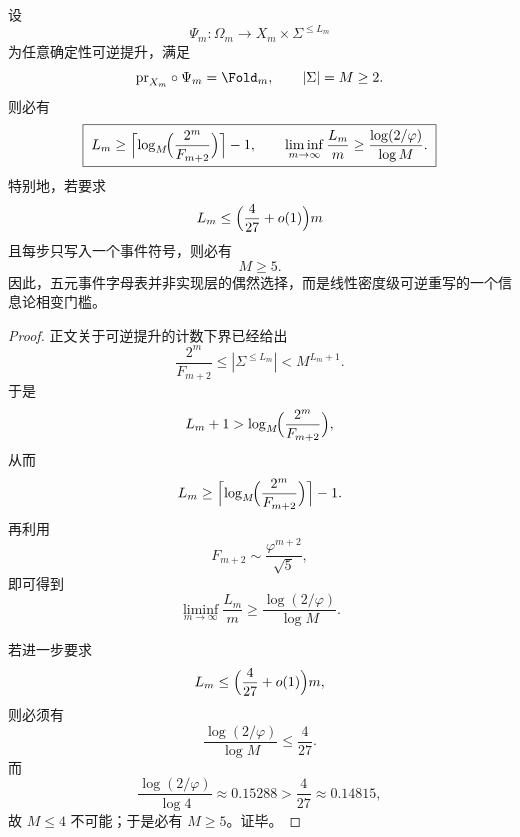 \begin{theorem}[五元事件字母表的不可降门槛]\label{thm:conclusion-godel-five-symbol-threshold}
设
\[
\Psi_m:\Omega_m\to X_m\times \Sigma^{\le L_m}
\]
为任意确定性可逆提升，满足
\[
\mathrm{pr}_{X_m}\circ\Psi_m=\Fold_m,
\qquad
|\Sigma|=M\ge 2.
\]
则必有
\[
\boxed{\;
L_m\ge \Bigl\lceil \log_M\!\Bigl(\frac{2^m}{F_{m+2}}\Bigr)\Bigr\rceil-1,\qquad
\liminf_{m\to\infty}\frac{L_m}{m}\ge \frac{\log(2/\varphi)}{\log M}.\;}
\]
特别地，若要求
\[
L_m\le \Bigl(\frac{4}{27}+o(1)\Bigr)m
\]
且每步只写入一个事件符号，则必有
\[
\boxed{\;M\ge 5.\;}
\]
因此，五元事件字母表并非实现层的偶然选择，而是线性密度级可逆重写的一个信息论相变门槛。
\end{theorem}
\begin{proof}
正文关于可逆提升的计数下界已经给出
\[
\frac{2^m}{F_{m+2}}\le |\Sigma^{\le L_m}|<M^{L_m+1}.
\]
于是
\[
L_m+1>\log_M\!\Bigl(\frac{2^m}{F_{m+2}}\Bigr),
\]
从而
\[
L_m\ge \Bigl\lceil \log_M\!\Bigl(\frac{2^m}{F_{m+2}}\Bigr)\Bigr\rceil-1.
\]
再利用
\[
F_{m+2}\sim \frac{\varphi^{m+2}}{\sqrt5},
\]
即可得到
\[
\liminf_{m\to\infty}\frac{L_m}{m}\ge \frac{\log(2/\varphi)}{\log M}.
\]

若进一步要求
\[
L_m\le \Bigl(\frac{4}{27}+o(1)\Bigr)m,
\]
则必须有
\[
\frac{\log(2/\varphi)}{\log M}\le \frac{4}{27}.
\]
而
\[
\frac{\log(2/\varphi)}{\log 4}\approx 0.15288>\frac{4}{27}\approx 0.14815,
\]
故 \(M\le 4\) 不可能；于是必有 \(M\ge 5\)。证毕。
\end{proof}
